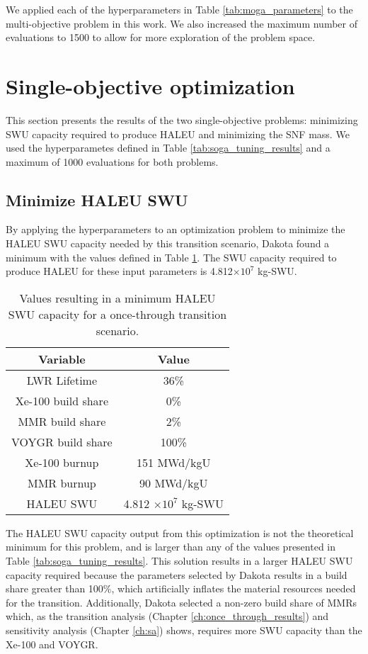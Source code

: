 We applied each of the hyperparameters in Table \ref{tab:moga_parameters}
to the multi-objective problem in this work. We also increased the 
maximum number of evaluations to 1500 to allow for more exploration 
of the problem space.

\section{Single-objective optimization}
This section presents the results of the two single-objective 
problems: minimizing \gls{SWU} capacity required to produce 
\gls{HALEU} and minimizing the \gls{SNF} mass. We used the hyperparametes 
defined in Table \ref{tab:soga_tuning_results} and a maximum 
of 1000 evaluations for both problems. 

\subsection{Minimize HALEU SWU}
By applying the hyperparameters to an optimization problem to minimize the 
\gls{HALEU} \gls{SWU} capacity needed by this transition scenario, Dakota
found a minimum with the values defined in Table \ref{tab:soga_ot_haleu}.
The \gls{SWU} capacity required to produce \gls{HALEU} for these input 
parameters is 4.812$\times 10^7$ kg-SWU.

\begin{table}[h!]
    \centering 
    \caption{Values resulting in a minimum \gls{HALEU} \gls{SWU} capacity for 
              a once-through transition scenario.}
    \label{tab:soga_ot_haleu}
    \begin{tabular}{c c}
        \hline
        Variable & Value \\
        \hline
        LWR Lifetime & 36\%\\
        Xe-100 build share & 0\%\\
        MMR build share & 2\%\\
        VOYGR build share & 100\%\\
        Xe-100 burnup & 151 MWd/kgU\\
        MMR burnup & 90 MWd/kgU\\
        \hline
        HALEU SWU & 4.812 $\times 10^7$ kg-SWU\\
        \hline
    \end{tabular}
\end{table}

The \gls{HALEU} \gls{SWU} capacity output from this optimization is not the
theoretical minimum for this problem, and is larger than any of the values 
presented in Table \ref{tab:soga_tuning_results}. This solution results in 
a larger \gls{HALEU} \gls{SWU} capacity required because the parameters selected 
by Dakota results in a build share greater than 100\%, which artificially 
inflates the material resources needed for the transition. Additionally, 
Dakota selected a non-zero build share of \glspl{MMR} which, as the transition 
analysis (Chapter \ref{ch:once_through_results}) and sensitivity analysis 
(Chapter \ref{ch:sa}) shows, requires more \gls{SWU} capacity than 
the Xe-100 and VOYGR. 

